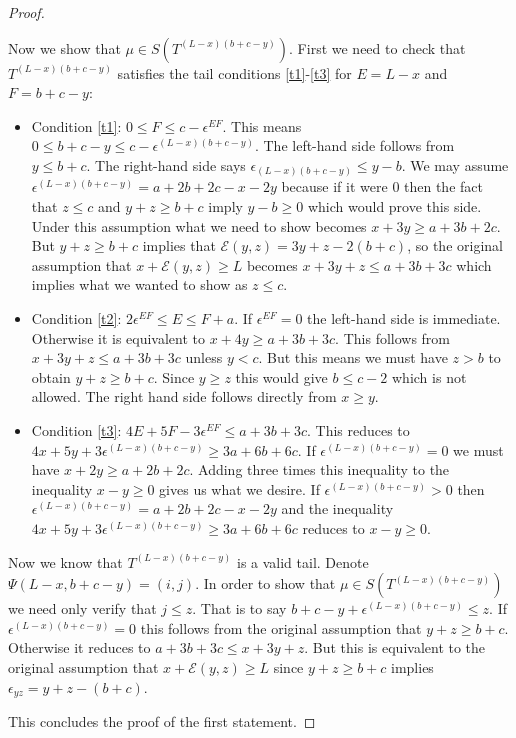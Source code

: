 \documentclass[11pt,reqno]{amsart}
\theoremstyle{definition}
\numberwithin{equation}{section}
\begin{document}
\begin{proof}
\begin{enumerate}
{Now we show that $\mu \in S(T^{(L-x)(b+c-y)})$. First we need to check that $T^{(L-x)(b+c-y)}$ satisfies the tail 
conditions \eqref{t1}-\eqref{t3} for $E=L-x$ and $F=b+c-y$:
\begin{itemize}
\item Condition \eqref{t1}: $0 \leqslant F \leqslant c- \epsilon^{EF}$.  This means $0 \leqslant b+c-y \leqslant
c- \epsilon^{(L-x)(b+c-y)}$. The left-hand side follows from $y \leqslant b+c$.  The right-hand side says 
$\epsilon_{(L-x)(b+c-y)} \leqslant y-b$. We may assume $\epsilon^{(L-x)(b+c-y)}=a+2b+2c-x-2y$ because if 
it were $0$ then the fact that $z \leqslant c$ and $y+z \geqslant b+c$ imply $y-b \geqslant 0$ which would prove this side.
Under this assumption what we need to show becomes $x+3y \geqslant a+3b+2c$.  But $y+z \geqslant b+c$ implies that 
$\mathcal{E}(y,z)=3y+z-2(b+c)$, so the original assumption that $x+\mathcal{E}(y,z) \geqslant L$ becomes 
$x+3y+z \leqslant a+3b+3c$ which implies what we wanted to show as $z \leqslant c$.  
\item Condition \eqref{t2}: $2\epsilon^{EF} \leqslant E \leqslant F+a$. If $\epsilon^{EF}=0$ the left-hand side is immediate.  
Otherwise it is equivalent to $x+4y \geqslant a+3b+3c$.  This follows from $x+3y+z \leqslant a+3b+3c$ unless $y<c$.  
But this means we must have $z>b$ to obtain $y+z \geqslant b+c$.  Since $y \geqslant z$ this would give $b \leqslant c-2$
which is not allowed.  The right hand side follows directly from $x \geqslant y$. 
\item Condition \eqref{t3}: $4E+5F-3\epsilon^{EF} \leqslant a+3b+3c$.  This reduces to $4x+5y+3\epsilon^{(L-x)(b+c-y)} 
\geqslant 3a+6b+6c$.  If $\epsilon^{(L-x)(b+c-y)}=0$ we must have $x+2y \geqslant a+2b+2c$. Adding three times this 
inequality to the inequality $x-y \geqslant 0$ gives us what we desire.  If $\epsilon^{(L-x)(b+c-y)}>0$ then 
$\epsilon^{(L-x)(b+c-y)}=a+2b+2c-x-2y$ and the inequality $4x+5y+3\epsilon^{(L-x)(b+c-y)} \geqslant 3a+6b+6c$ 
reduces to $x-y \geq 0$.
\end{itemize}
Now we know that $T^{(L-x)(b+c-y)}$ is a valid tail. Denote $\Psi(L-x,b+c-y)=(i,j)$. In order to show that 
$\mu \in S(T^{(L-x)(b+c-y)})$ we need only verify that $j \leqslant z$.  That is to say $b+c-y+\epsilon^{(L-x)(b+c-y)} \leqslant z$.
If $\epsilon^{(L-x)(b+c-y)}=0$ this follows from the original assumption that $y+z \geqslant b+c$. Otherwise it reduces to 
$a+3b+3c \leqslant x+3y+z$.  But this is equivalent to the original assumption that $x+\mathcal{E}(y,z) \geqslant L$ 
since $y+z \geqslant b+c$ implies $\epsilon_{yz}=y+z-(b+c)$.}
\end{enumerate}
This concludes the proof of the first statement.


\end{proof}
\end{document}
